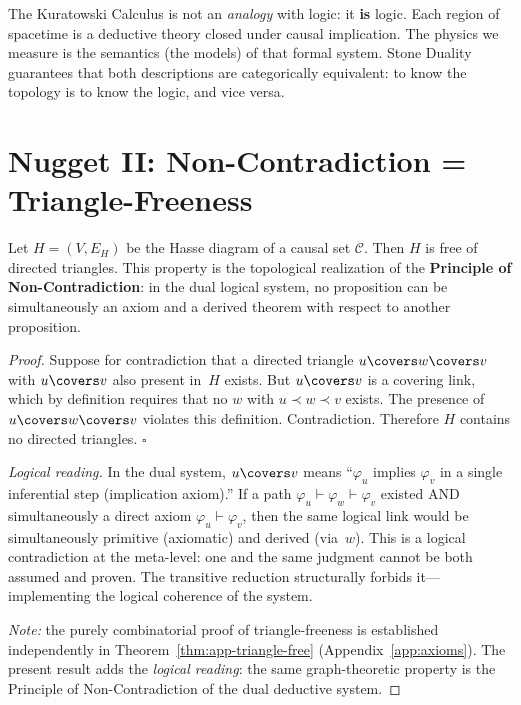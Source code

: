 \begin{result}[title={Spacetime Is a Deductive System}]
\label{res:stone-deductive-system}
The Kuratowski Calculus is not an \emph{analogy} with logic:
it \textbf{is} logic. Each region of spacetime is a deductive
theory closed under causal implication. The physics we measure is
the semantics (the models) of that formal system. Stone
Duality~\cite{stone1936} guarantees that both descriptions are
categorically equivalent: to know the topology is to know the
logic, and vice versa.
\end{result}

\section{Nugget II: Non-Contradiction = Triangle-Freeness}

\begin{theorem}
\label{thm:non-contradiction}
Let $H = (V, E_H)$ be the Hasse diagram of a causal set
$\mathcal{C}$. Then $H$ is free of directed triangles.
This property is the topological realization of the \textbf{Principle
of Non-Contradiction}: in the dual logical system, no
proposition can be simultaneously an axiom and a derived theorem
with respect to another proposition.
\end{theorem}

\begin{proof}
Suppose for contradiction that a directed triangle
$u \covers w \covers v$ with $u \covers v$ also
present in~$H$ exists. But $u \covers v$ is a covering link,
which by definition requires that no $w$ with
$u \prec w \prec v$ exists. The presence of $u \covers w \covers v$
violates this definition. Contradiction. Therefore $H$ contains no
directed triangles. $\square$

\medskip\noindent
\textit{Logical reading.} In the dual system, $u \covers v$
means ``$\varphi_u$ implies $\varphi_v$ in a single
inferential step (implication axiom).'' If a path
$\varphi_u \vdash \varphi_w \vdash \varphi_v$ existed AND simultaneously a
direct axiom $\varphi_u \vdash \varphi_v$, then the same
logical link would be simultaneously primitive (axiomatic) and
derived (via~$w$). This is a logical contradiction at the
meta-level: one and the same judgment cannot be both assumed and
proven. The transitive reduction structurally forbids
it---implementing the logical coherence of the system.

\smallskip\noindent
\textit{Note:} the purely combinatorial proof of triangle-freeness
is established independently in
Theorem~\ref{thm:app-triangle-free} (Appendix~\ref{app:axioms}).
The present result adds the \emph{logical reading}: the same
graph-theoretic property is the Principle of Non-Contradiction of the
dual deductive system.
\end{proof}

